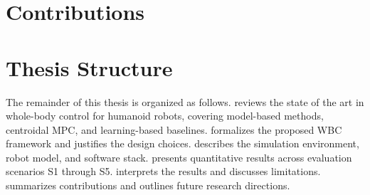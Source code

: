 
\lipsum[4]

\section{Contributions}
\label{sec:contributions}


\lipsum[5]

\section{Thesis Structure}
\label{sec:structure}

The remainder of this thesis is organized as follows.
 reviews the state of the art in whole-body control for humanoid
robots, covering model-based methods, centroidal MPC, and learning-based baselines.
 formalizes the proposed WBC framework and justifies the
design choices.
 describes the simulation environment, robot model, and
software stack.
 presents quantitative results across evaluation scenarios
S1 through S5.
 interprets the results and discusses limitations.
 summarizes contributions and outlines future research
directions.

